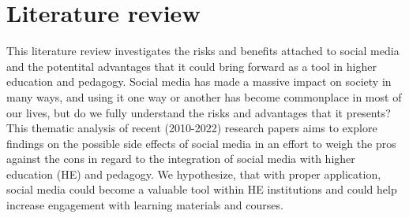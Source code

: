 \documentclass[lettersize,journal]{IEEEtran}
\begin{document}
\section{Literature review}
	This literature review investigates the risks and benefits attached to
    social media and the potentital advantages that it could bring forward as a
    tool in higher education and pedagogy. Social media has made a massive
    impact on society in many ways, and using it one way or another has become
    commonplace in most of our lives, but do we fully understand the risks and
    advantages that it presents? This thematic analysis of recent (2010-2022)
    research papers aims to explore findings on the possible side effects of
    social media in an effort to weigh the pros against the cons in regard to
    the integration of social media with higher education (HE) and pedagogy. We
    hypothesize, that with proper application, social media could become a valuable tool within HE institutions and could help increase engagement with learning materials and courses.
\end{document}
